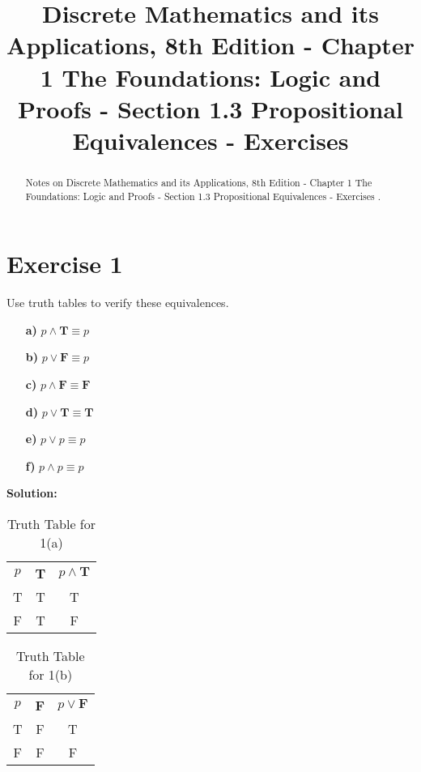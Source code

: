 \documentclass{Axon}
\title{Discrete Mathematics and its Applications, 8th Edition - Chapter 1 The Foundations: Logic and Proofs - Section 1.3 Propositional Equivalences - Exercises}
\begin{document}
\maketitle
\makeauthor
\begin{abstract}
Notes on Discrete Mathematics and its Applications, 8th Edition - Chapter 1 The Foundations: Logic and Proofs - Section 1.3 Propositional Equivalences - Exercises \cite{Rosen}.
\end{abstract}
\section*{Exercise 1}
Use truth tables to verify these equivalences.

\begin{enumerate}
    \item[\textbf{a)}] \(p \land \textbf{T} \equiv p\)
    \item[\textbf{b)}] \(p \lor \textbf{F} \equiv p\)
    \item[\textbf{c)}] \(p \land \textbf{F} \equiv \textbf{F}\)
    \item[\textbf{d)}] \(p \lor \textbf{T} \equiv \textbf{T}\)
    \item[\textbf{e)}] \(p \lor p \equiv p\)
    \item[\textbf{f)}] \(p \land p \equiv p\)
\end{enumerate}

\noindent
\textbf{Solution:}
\begin{table}[h]
    \centering
    \begin{tabular}{c|c|c}
        \(p\) & \textbf{T} & \(p \land \textbf{T}\) \\
        T     & T          & T                      \\
        F     & T          & F
    \end{tabular}
    \caption{Truth Table for 1(a)}
\end{table}

\begin{table}[h]
    \centering
    \begin{tabular}{c|c|c}
        \(p\) & \textbf{F} & \(p \lor \textbf{F}\) \\
        T     & F          & T                     \\
        F     & F          & F
    \end{tabular}
    \caption{Truth Table for 1(b)}
\end{table}
\end{document}
